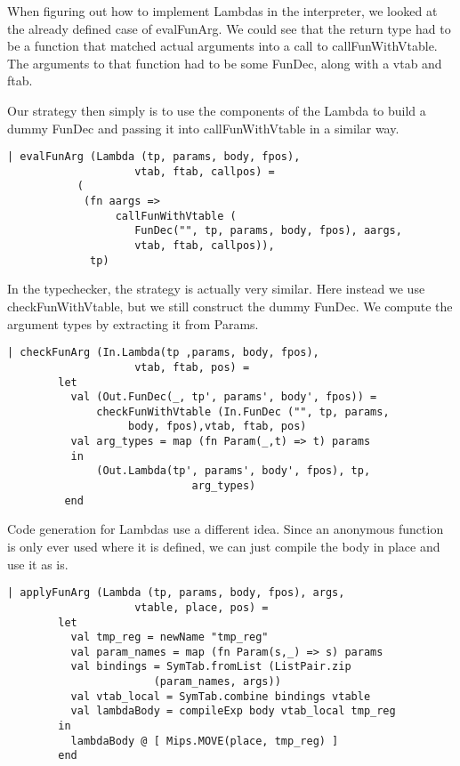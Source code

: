 \documentclass[10pt]{article}
\begin{document}
When figuring out how to implement Lambdas in the interpreter, we looked at the already defined case of evalFunArg. We could see that the return type had to be a function that matched actual arguments into a call to callFunWithVtable. The arguments to that function had to be some FunDec, along with a vtab and ftab.

Our strategy then simply is to use the components of the Lambda to build a dummy FunDec and passing it into callFunWithVtable in a similar way.

\begin{Verbatim}[frame=single]
    | evalFunArg (Lambda (tp, params, body, fpos),
					vtab, ftab, callpos) =
           (
            (fn aargs =>
                 callFunWithVtable (
                    FunDec("", tp, params, body, fpos), aargs,
					vtab, ftab, callpos)),
             tp)
\end{Verbatim}

In the typechecker, the strategy is actually very similar. Here instead we use checkFunWithVtable, but we still construct the dummy FunDec. We compute the argument types by extracting it from Params.

\begin{Verbatim}[frame=single]
    | checkFunArg (In.Lambda(tp ,params, body, fpos),
					vtab, ftab, pos) =
        let 
          val (Out.FunDec(_, tp', params', body', fpos)) = 
              checkFunWithVtable (In.FunDec ("", tp, params,
				   body, fpos),vtab, ftab, pos)
          val arg_types = map (fn Param(_,t) => t) params
          in
              (Out.Lambda(tp', params', body', fpos), tp,
						     arg_types)
         end
\end{Verbatim}

Code generation for Lambdas use a different idea. Since an anonymous function is only ever used where it is defined, we can just compile the body in place and use it as is.

\begin{Verbatim}[frame=single]
      | applyFunArg (Lambda (tp, params, body, fpos), args,
					vtable, place, pos) =
        let  
          val tmp_reg = newName "tmp_reg"
          val param_names = map (fn Param(s,_) => s) params
          val bindings = SymTab.fromList (ListPair.zip
					   (param_names, args))
          val vtab_local = SymTab.combine bindings vtable
          val lambdaBody = compileExp body vtab_local tmp_reg
        in   
          lambdaBody @ [ Mips.MOVE(place, tmp_reg) ]
        end
\end{Verbatim}
\end{document}
